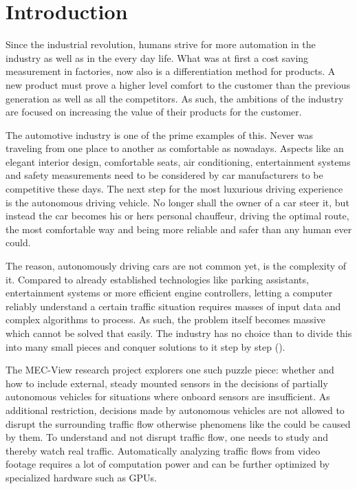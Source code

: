 \chapter{Introduction}

Since the industrial revolution, humans strive for more automation in the industry as well as in the every day life.
What was at first a cost saving measurement in factories, now also is a differentiation method for products.
A new product must prove a higher level comfort to the customer than the previous generation as well as all the competitors.
As such, the ambitions of the industry are focused on increasing the value of their products for the customer.

The automotive industry is one of the prime examples of this.
Never was traveling from one place to another as comfortable as nowadays.
Aspects like an elegant interior design, comfortable seats, air conditioning, entertainment systems and safety measurements need to be considered by car manufacturers to be competitive these days. 
The next step  for the most luxurious driving experience is the autonomous driving vehicle.
No longer shall the owner of a car steer it, but instead the car becomes his or hers personal chauffeur, driving the optimal route, the most comfortable way and being more reliable and safer than any human ever could.

The reason, autonomously driving cars are not common yet, is the complexity of it.
Compared to already established technologies like parking assistants, entertainment systems or more efficient engine controllers, letting a computer reliably understand a certain traffic situation requires masses of input data and complex algorithms to process.
As such, the problem itself becomes massive which cannot be solved that easily.
The industry has no choice than to divide this into many small pieces and conquer solutions to it step by step ().

The MEC-View research project explorers one such puzzle piece: whether and how to include external, steady mounted sensors in the decisions of partially autonomous vehicles for situations where onboard sensors are insufficient.
As additional restriction, decisions made by autonomous vehicles  are not allowed to disrupt the surrounding traffic flow otherwise phenomens like the  could be caused by them.
To understand and not disrupt traffic flow, one needs to study and thereby watch real traffic.
Automatically analyzing traffic flows from video footage requires a lot of computation power and can be further optimized by specialized hardware such as GPUs.

